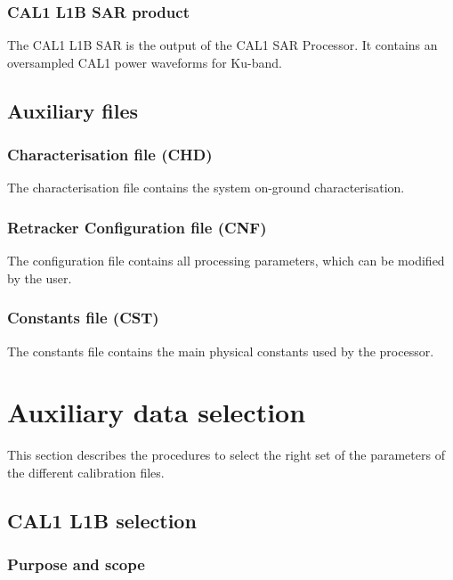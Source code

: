 \documentclass[11pt,a4paper]{article}
\begin{document}
\subsubsection{CAL1 L1B SAR product}

The CAL1 L1B SAR is the output of the CAL1 SAR Processor. It contains an oversampled CAL1 power waveforms for Ku-band. 


\subsection{Auxiliary files}\label{sec:auxiliary_files}


\subsubsection{Characterisation file (CHD)}\label{sec:chd}

The characterisation file contains the system on-ground characterisation. 

\subsubsection{Retracker Configuration file (CNF)}\label{sec:cnf}

The configuration file contains all processing parameters, which can be modified by the user.

\subsubsection{Constants file (CST)}\label{sec:cst}

The constants file contains the main physical constants used by the processor.




\clearpage
\newpage
\section{Auxiliary data selection}

This section describes the procedures to select the right set of the parameters of the different calibration files.

\subsection{CAL1 L1B selection}

\subsubsection{Purpose and scope}
\end{document}
